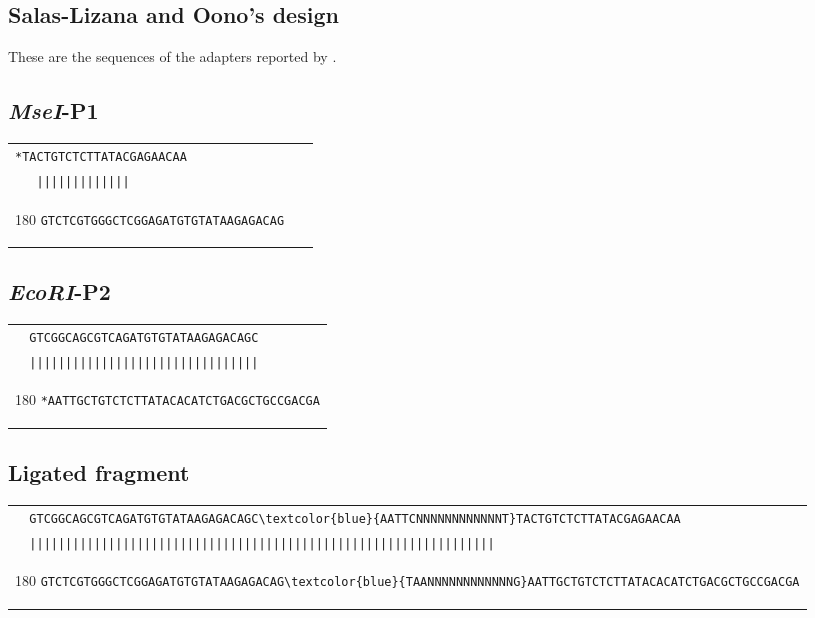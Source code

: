 \documentclass[a4paper,12pt]{article}
\author{J. Ignacio Lucas Lledó}
\begin{document}
\begin{flushleft}
\section{Salas-Lizana and Oono's design}
These are the sequences of the adapters reported by \cite{Salas-Lizana2018}.

\subsection*{\emph{MseI}-P1}

\begin{tabular}{l}
\verb+*TACTGTCTCTTATACGAGAACAA+\\
\verb+   |||||||||||||+\\[-8pt]
   \begin{turn}{180}
   \verb+GTCTCGTGGGCTCGGAGATGTGTATAAGAGACAG   +
   \end{turn}
\\
\end{tabular}
\vspace*{0.3cm}

\subsection*{\emph{EcoRI}-P2}

\begin{tabular}{l}
\verb+  GTCGGCAGCGTCAGATGTGTATAAGAGACAGC+\\
\verb+  ||||||||||||||||||||||||||||||||+\\[-8pt]
   \begin{turn}{180}
   \verb+*AATTGCTGTCTCTTATACACATCTGACGCTGCCGACGA+
   \end{turn}
\\
\end{tabular}
\vspace*{0.3cm}

\subsection*{Ligated fragment}

\begin{tabular}{l}
   \Verb+  GTCGGCAGCGTCAGATGTGTATAAGAGACAGC\textcolor{blue}{AATTCNNNNNNNNNNNNT}TACTGTCTCTTATACGAGAACAA+\\[-4pt]
   \Verb+  |||||||||||||||||||||||||||||||||||||||||||||||||||||||||||||||||+\\[-10pt]
   \begin{turn}{180}
      \Verb+GTCTCGTGGGCTCGGAGATGTGTATAAGAGACAG\textcolor{blue}{TAANNNNNNNNNNNNG}AATTGCTGTCTCTTATACACATCTGACGCTGCCGACGA+
   \end{turn}
\\
\end{tabular}
\vspace*{0.3cm}


\end{flushleft}
\end{document}
